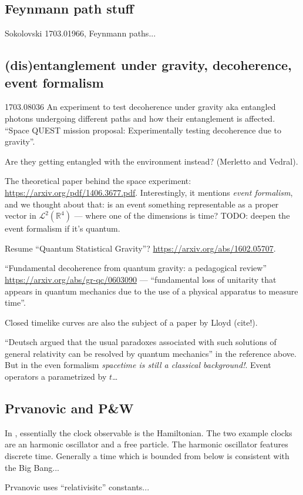 \subsection{Feynmann path stuff}

Sokolovski 1703.01966, Feynmann paths...\subsection{(dis)entanglement under gravity, decoherence, event formalism}

1703.08036 An experiment to test decoherence under gravity aka entangled photons undergoing different paths and how their entanglement is affected.
``Space QUEST mission proposal: Experimentally testing decoherence due to gravity''.

Are they getting entangled with the environment instead? (Merletto and Vedral).

The theoretical paper behind the space experiment: \url{https://arxiv.org/pdf/1406.3677.pdf}. Interestingly, it mentions 
\emph{event formalism}, and we thought about that: is an event something
representable as a proper vector in $\mathcal{L}^2(\mathbb{R}^4)$ --- where one of the dimensions is time?
TODO: deepen the event formalism if it's quantum.

Resume ``Quantum Statistical Gravity''? \url{https://arxiv.org/abs/1602.05707}.

``Fundamental decoherence from quantum gravity: a pedagogical review''
\url{https://arxiv.org/abs/gr-qc/0603090} ---
``fundamental loss of unitarity
that appears in quantum mechanics
due to the use of a physical apparatus to measure time''.

Closed timelike curves are also the subject of a paper by Lloyd (cite!).

``Deutsch argued that
the usual paradoxes associated with such solutions of general
relativity can be resolved by quantum mechanics''  in the reference above. But in the even formalism
\emph{spacetime is still a classical background!}. Event operators a parametrized by $t$\dots

\subsection{Prvanovic and P\&W}
In \cite{Prvanovic}, essentially the clock observable is the Hamiltonian.
The two example clocks are an harmonic oscillator and a free particle.
The harmonic oscillator features discrete time. Generally a time which is
{bounded from below}
is consistent with the Big Bang...

Prvanovic uses ``relativisitc'' constants...



